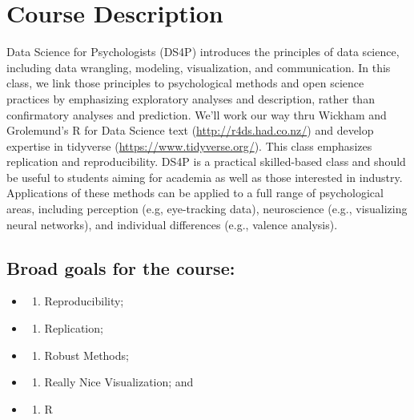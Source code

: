 \documentclass[
]{book}
\providecommand{\tightlist}{%
  \setlength{\itemsep}{0pt}\setlength{\parskip}{0pt}}
\begin{document}
\section*{Course Description}\label{course-description-2}


Data Science for Psychologists (DS4P) introduces the principles of data science, including data wrangling, modeling, visualization, and communication. In this class, we link those principles to psychological methods and open science practices by emphasizing exploratory analyses and description, rather than confirmatory analyses and prediction. We'll work our way thru Wickham and Grolemund's R for Data Science text (\url{http://r4ds.had.co.nz/}) and develop expertise in tidyverse (\url{https://www.tidyverse.org/}). This class emphasizes replication and reproducibility. DS4P is a practical skilled-based class and should be useful to students aiming for academia as well as those interested in industry. Applications of these methods can be applied to a full range of psychological areas, including perception (e.g, eye-tracking data), neuroscience (e.g., visualizing neural networks), and individual differences (e.g., valence analysis).

\subsection*{Broad goals for the course:}\label{broad-goals-for-the-course-1}


\begin{itemize}
\tightlist
\item
  \begin{enumerate}
  \def\labelenumi{\arabic{enumi}.}
  \tightlist
  \item
    Reproducibility;
  \end{enumerate}
\item
  \begin{enumerate}
  \def\labelenumi{\arabic{enumi}.}
  \setcounter{enumi}{1}
  \tightlist
  \item
    Replication;
  \end{enumerate}
\item
  \begin{enumerate}
  \def\labelenumi{\arabic{enumi}.}
  \setcounter{enumi}{2}
  \tightlist
  \item
    Robust Methods;
  \end{enumerate}
\item
  \begin{enumerate}
  \def\labelenumi{\arabic{enumi}.}
  \setcounter{enumi}{3}
  \tightlist
  \item
    Really Nice Visualization; and
  \end{enumerate}
\item
  \begin{enumerate}
  \def\labelenumi{\arabic{enumi}.}
  \setcounter{enumi}{4}
  \tightlist
  \item
    R
  \end{enumerate}
\end{itemize}
\end{document}
